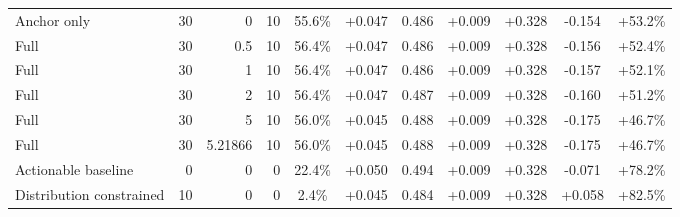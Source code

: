 \begin{table}[htbp]
\begin{tabular}{lrrrccccccc}
Anchor only & 30 & 0 & 10 & 55.6\% & +0.047 & 0.486 & +0.009 & +0.328 & -0.154 & +53.2\% \\
Full & 30 & 0.5 & 10 & 56.4\% & +0.047 & 0.486 & +0.009 & +0.328 & -0.156 & +52.4\% \\
Full & 30 & 1 & 10 & 56.4\% & +0.047 & 0.486 & +0.009 & +0.328 & -0.157 & +52.1\% \\
Full & 30 & 2 & 10 & 56.4\% & +0.047 & 0.487 & +0.009 & +0.328 & -0.160 & +51.2\% \\
Full & 30 & 5 & 10 & 56.0\% & +0.045 & 0.488 & +0.009 & +0.328 & -0.175 & +46.7\% \\
Full & 30 & 5.21866 & 10 & 56.0\% & +0.045 & 0.488 & +0.009 & +0.328 & -0.175 & +46.7\% \\
Actionable baseline & 0 & 0 & 0 & 22.4\% & +0.050 & 0.494 & +0.009 & +0.328 & -0.071 & +78.2\% \\
Distribution constrained & 10 & 0 & 0 & 2.4\% & +0.045 & 0.484 & +0.009 & +0.328 & +0.058 & +82.5\% \\
\bottomrule
\end{tabular}
\end{table}